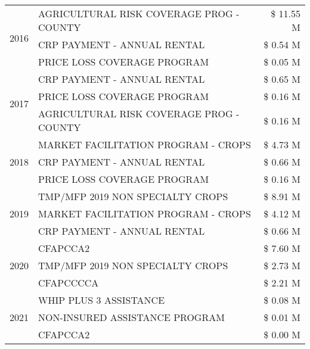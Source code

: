 \begin{tabular}{llr}
\cline{1-3}
\multirow[t]{3}{*}{2016} & AGRICULTURAL RISK COVERAGE PROG - COUNTY      & \$ 11.55 M \\
 & CRP PAYMENT - ANNUAL RENTAL                   & \$ 0.54 M \\
 & PRICE LOSS COVERAGE PROGRAM                   & \$ 0.05 M \\
\cline{1-3}
\multirow[t]{3}{*}{2017} & CRP PAYMENT - ANNUAL RENTAL & \$ 0.65 M \\
 & PRICE LOSS COVERAGE PROGRAM & \$ 0.16 M \\
 & AGRICULTURAL RISK COVERAGE PROG - COUNTY & \$ 0.16 M \\
\cline{1-3}
\multirow[t]{3}{*}{2018} & MARKET FACILITATION PROGRAM - CROPS & \$ 4.73 M \\
 & CRP PAYMENT - ANNUAL RENTAL & \$ 0.66 M \\
 & PRICE LOSS COVERAGE PROGRAM & \$ 0.16 M \\
\cline{1-3}
\multirow[t]{3}{*}{2019} & TMP/MFP 2019 NON SPECIALTY CROPS & \$ 8.91 M \\
 & MARKET FACILITATION PROGRAM - CROPS & \$ 4.12 M \\
 & CRP PAYMENT - ANNUAL RENTAL & \$ 0.66 M \\
\cline{1-3}
\multirow[t]{3}{*}{2020} & CFAPCCA2 & \$ 7.60 M \\
 & TMP/MFP 2019 NON SPECIALTY CROPS & \$ 2.73 M \\
 & CFAPCCCCA & \$ 2.21 M \\
\cline{1-3}
\multirow[t]{3}{*}{2021} & WHIP PLUS 3 ASSISTANCE & \$ 0.08 M \\
 & NON-INSURED ASSISTANCE PROGRAM & \$ 0.01 M \\
 & CFAPCCA2 & \$ 0.00 M \\
\cline{1-3}
\bottomrule
\end{tabular}
